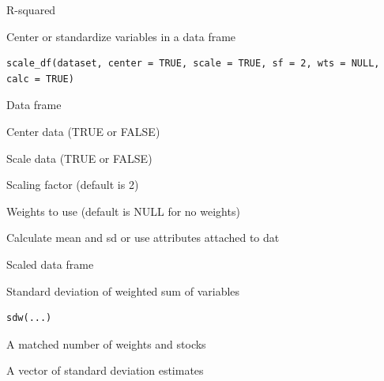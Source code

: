 \documentclass[a4paper]{book}
\begin{document}
%
\begin{Value}
R-squared
\end{Value}
%
\begin{Description}
Center or standardize variables in a data frame
\end{Description}
%
\begin{Usage}
\begin{verbatim}
scale_df(dataset, center = TRUE, scale = TRUE, sf = 2, wts = NULL, calc = TRUE)
\end{verbatim}
\end{Usage}
%
\begin{Arguments}
\begin{ldescription}
\item[\code{dataset}] Data frame

\item[\code{center}] Center data (TRUE or FALSE)

\item[\code{scale}] Scale data (TRUE or FALSE)

\item[\code{sf}] Scaling factor (default is 2)

\item[\code{wts}] Weights to use (default is NULL for no weights)

\item[\code{calc}] Calculate mean and sd or use attributes attached to dat
\end{ldescription}
\end{Arguments}
%
\begin{Value}
Scaled data frame
\end{Value}
%
\begin{Description}
Standard deviation of weighted sum of variables
\end{Description}
%
\begin{Usage}
\begin{verbatim}
sdw(...)
\end{verbatim}
\end{Usage}
%
\begin{Arguments}
\begin{ldescription}
\item[\code{...}] A matched number of weights and stocks
\end{ldescription}
\end{Arguments}
%
\begin{Value}
A vector of standard deviation estimates
\end{Value}
\end{document}
